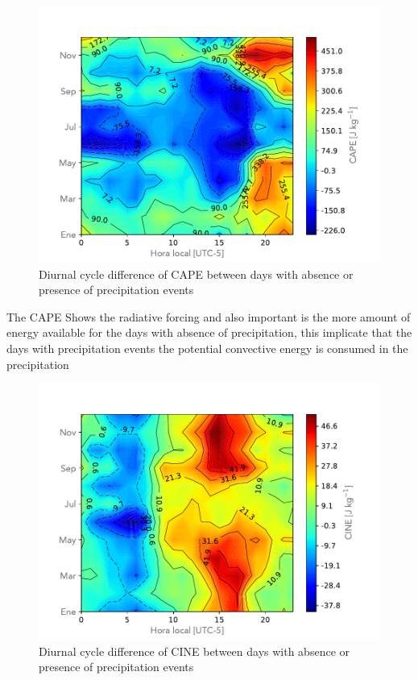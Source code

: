 \documentclass[	DIV=calc,%
							paper=a4,%
							fontsize=11pt,%
							twocolumn]{scrartcl}	 					%
\begin{document}
\begin{figure}[h!]
\centering
\includegraphics[width=1.0\linewidth]{Figuras/CAPE_Matrix_resta.pdf}
\caption{Diurnal cycle difference of CAPE between days with absence or presence of precipitation events }
\label{fig:CAPEdifference}
\end{figure}

The CAPE Shows the radiative forcing and also important is the more amount of energy available for the days with absence of precipitation, this implicate that the days with precipitation events the potential convective energy is consumed in the precipitation



\begin{figure}[h!]
\centering
\includegraphics[width=1.0\linewidth]{Figuras/CINE_Matrix_resta.pdf}
\caption{Diurnal cycle difference of CINE between days with absence or presence of precipitation events }
\label{fig:CINEdifference}
\end{figure}
\end{document}
